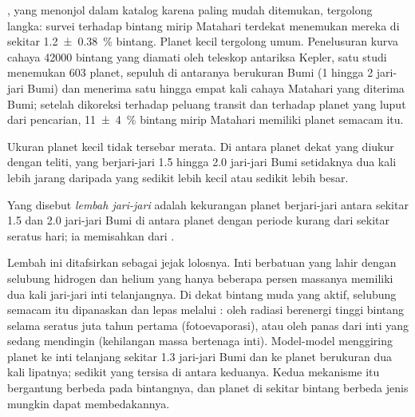 , yang menonjol dalam katalog karena paling mudah
ditemukan, tergolong langka: survei  terhadap bintang mirip Matahari terdekat menemukan
mereka di sekitar \qty[separate-uncertainty=true]{1.2 \pm 0.38}{\percent} bintang. Planet kecil tergolong
umum. Penelusuran kurva cahaya \num{42000} bintang yang diamati oleh
teleskop antariksa Kepler, satu studi menemukan 603 planet, sepuluh di antaranya berukuran Bumi (1 hingga 2
jari-jari Bumi) dan menerima satu hingga empat kali cahaya Matahari yang diterima Bumi;
setelah dikoreksi terhadap peluang transit dan terhadap planet yang luput dari
pencarian, \qty[separate-uncertainty=true]{11 \pm 4}{\percent} bintang mirip Matahari memiliki
planet semacam itu.

Ukuran planet kecil tidak tersebar merata. Di antara planet dekat yang
diukur dengan teliti, yang berjari-jari 1.5 hingga 2.0 jari-jari Bumi setidaknya dua kali
lebih jarang daripada yang sedikit lebih kecil atau sedikit lebih besar.

\begin{definition}\label{def:b3:exoplanets:radius-valley}
Yang disebut \emph{lembah jari-jari} adalah kekurangan planet
berjari-jari antara sekitar 1.5 dan 2.0 jari-jari Bumi di antara planet dengan
periode kurang dari sekitar seratus hari; ia memisahkan 
dari .
\end{definition}

Lembah ini ditafsirkan sebagai jejak lolosnya. Inti berbatuan yang lahir dengan
selubung hidrogen dan helium yang hanya beberapa persen massanya memiliki dua kali
jari-jari inti telanjangnya. Di dekat bintang muda yang aktif, selubung
semacam itu dipanaskan dan lepas melalui : oleh
radiasi berenergi tinggi bintang selama seratus juta tahun pertama
(fotoevaporasi), atau oleh panas dari inti yang sedang mendingin (kehilangan
massa bertenaga inti). Model-model menggiring planet ke inti telanjang sekitar 1.3 jari-jari Bumi
dan ke planet berukuran dua kali lipatnya; sedikit yang tersisa di antara keduanya. Kedua
mekanisme itu bergantung berbeda pada bintangnya, dan planet di sekitar bintang
berbeda jenis mungkin dapat membedakannya.

